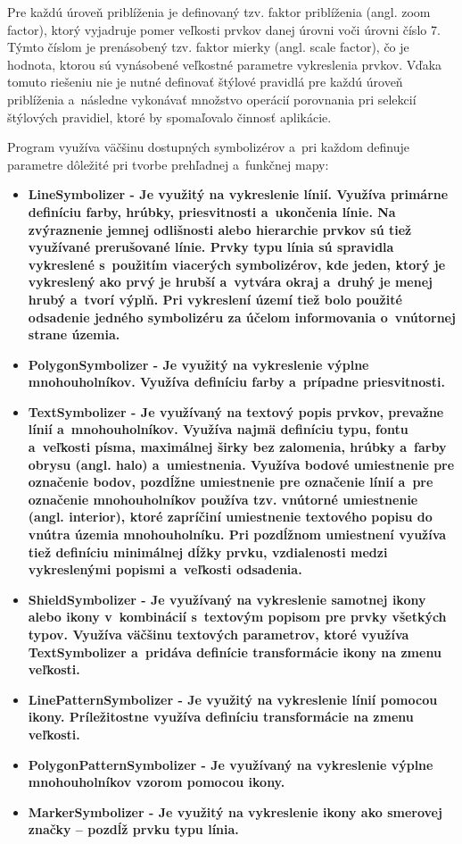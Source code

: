 Pre každú úroveň priblíženia je definovaný tzv. faktor priblíženia (angl. zoom factor), ktorý vyjadruje pomer veľkosti prvkov danej úrovni voči úrovni číslo 7. Týmto číslom je prenásobený tzv. faktor mierky (angl. scale factor), čo je hodnota, ktorou sú vynásobené veľkostné parametre vykreslenia prvkov. Vďaka tomuto riešeniu nie je nutné definovať štýlové pravidlá pre každú úroveň priblíženia a~následne vykonávať množstvo operácií porovnania pri selekcií štýlových pravidiel, ktoré by spomaľovalo činnosť aplikácie.

Program využíva väčšinu dostupných symbolizérov a~pri každom definuje parametre dôležité pri tvorbe prehľadnej a~funkčnej mapy:
\begin{itemize}
  \item{\bf LineSymbolizer \rm - Je využitý na vykreslenie línií. Využíva primárne definíciu farby, hrúbky, priesvitnosti a~ukončenia línie. Na zvýraznenie jemnej odlišnosti alebo hierarchie prvkov sú tiež využívané prerušované línie. Prvky typu línia sú spravidla vykreslené s~použitím viacerých symbolizérov, kde jeden, ktorý je vykreslený ako prvý je hrubší a~vytvára okraj a~druhý je menej hrubý a~tvorí výplň. Pri vykreslení území tiež bolo použité odsadenie jedného symbolizéru za účelom informovania o~vnútornej strane územia.}
  \item{\bf PolygonSymbolizer \rm - Je využitý na vykreslenie výplne mnohouholníkov. Využíva definíciu farby a~prípadne priesvitnosti.}
  \item{\bf TextSymbolizer \rm - Je využívaný na textový popis prvkov, prevažne línií a~mnohouholníkov. Využíva najmä definíciu typu, fontu a~veľkosti písma, maximálnej širky bez zalomenia, hrúbky a~farby obrysu (angl. halo) a~umiestnenia. Využíva bodové umiestnenie pre označenie bodov, pozdĺžne umiestnenie pre označenie línií a~pre označenie mnohouholníkov používa tzv. vnútorné umiestnenie (angl. interior), ktoré zapríčiní umiestnenie textového popisu do vnútra územia mnohouholníku. Pri pozdĺžnom umiestnení využíva tiež definíciu minimálnej dĺžky prvku, vzdialenosti medzi vykreslenými popismi a~veľkosti odsadenia.}
  \item{\bf ShieldSymbolizer \rm - Je využívaný na vykreslenie samotnej ikony alebo ikony v~kombinácií s~textovým popisom pre prvky všetkých typov. Využíva väčšinu textových parametrov, ktoré využíva TextSymbolizer a~pridáva definície transformácie ikony na zmenu veľkosti.}
  \item{\bf LinePatternSymbolizer \rm - Je využitý na vykreslenie línií pomocou ikony. Príležitostne využíva definíciu transformácie na zmenu veľkosti.}
  \item{\bf PolygonPatternSymbolizer \rm - Je využívaný na vykreslenie výplne mnohouholníkov vzorom pomocou ikony.}
  \item{\bf MarkerSymbolizer \rm - Je využitý na vykreslenie ikony ako smerovej značky -- pozdĺž prvku typu línia.}
\end{itemize}

